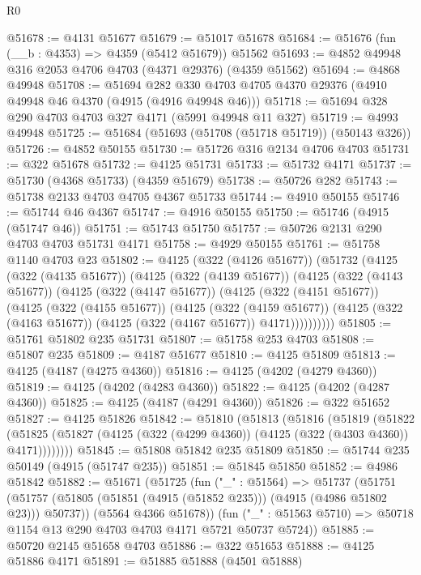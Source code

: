 \begin{lexlean}{R0}
\begin{coremodule}
@51678 := @4131 @51677
@51679 := @51017 @51678
@51684 := @51676 (fun (__b : @4353) => @4359 (@5412 @51679)) @51562
@51693 := @4852 @49948 @316 @2053 @4706 @4703 (@4371 @29376) (@4359 @51562)
@51694 := @4868 @49948
@51708 := @51694
    @282
    @330
    @4703
    @4705
    @4370
    @29376
    (@4910 @49948 @46 @4370 (@4915 (@4916 @49948 @46)))
@51718 := @51694 @328 @290 @4703 @4703 @327 @4171 (@5991 @49948 @11 @327)
@51719 := @4993 @49948
@51725 := @51684 (@51693 (@51708 (@51718 @51719)) (@50143 @326))
@51726 := @4852 @50155
@51730 := @51726 @316 @2134 @4706 @4703
@51731 := @322 @51678
@51732 := @4125 @51731
@51733 := @51732 @4171
@51737 := @51730 (@4368 @51733) (@4359 @51679)
@51738 := @50726 @282
@51743 := @51738 @2133 @4703 @4705 @4367 @51733
@51744 := @4910 @50155
@51746 := @51744 @46 @4367
@51747 := @4916 @50155
@51750 := @51746 (@4915 (@51747 @46))
@51751 := @51743 @51750
@51757 := @50726 @2131 @290 @4703 @4703 @51731 @4171
@51758 := @4929 @50155
@51761 := @51758 @1140 @4703 @23
@51802 := @4125
    (@322 (@4126 @51677))
    (@51732
      (@4125
        (@322 (@4135 @51677))
        (@4125
          (@322 (@4139 @51677))
          (@4125
            (@322 (@4143 @51677))
            (@4125
              (@322 (@4147 @51677))
              (@4125
                (@322 (@4151 @51677))
                (@4125
                  (@322 (@4155 @51677))
                  (@4125
                    (@322 (@4159 @51677))
                    (@4125 (@322 (@4163 @51677)) (@4125 (@322 (@4167 @51677)) @4171))))))))))
@51805 := @51761 @51802 @235 @51731
@51807 := @51758 @253 @4703
@51808 := @51807 @235
@51809 := @4187 @51677
@51810 := @4125 @51809
@51813 := @4125 (@4187 (@4275 @4360))
@51816 := @4125 (@4202 (@4279 @4360))
@51819 := @4125 (@4202 (@4283 @4360))
@51822 := @4125 (@4202 (@4287 @4360))
@51825 := @4125 (@4187 (@4291 @4360))
@51826 := @322 @51652
@51827 := @4125 @51826
@51842 := @51810
    (@51813
      (@51816
        (@51819
          (@51822
            (@51825 (@51827 (@4125 (@322 (@4299 @4360)) (@4125 (@322 (@4303 @4360)) @4171))))))))
@51845 := @51808 @51842 @235 @51809
@51850 := @51744 @235 @50149 (@4915 (@51747 @235))
@51851 := @51845 @51850
@51852 := @4986 @51842
@51882 := @51671
    (@51725
      (fun ("_" : @51564) =>
      @51737
        (@51751 (@51757 (@51805 (@51851 (@4915 (@51852 @235))) (@4915 (@4986 @51802 @23))) @50737))
        (@5564 @4366 @51678))
      (fun ("_" : @51563 @5710) => @50718 @1154 @13 @290 @4703 @4703 @4171 @5721 @50737 @5724))
@51885 := @50720 @2145 @51658 @4703
@51886 := @322 @51653
@51888 := @4125 @51886 @4171
@51891 := @51885 @51888 (@4501 @51888)

\end{coremodule}
\end{lexlean}
